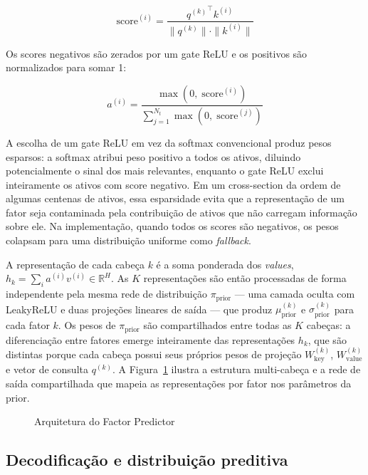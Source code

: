 \begin{equation}
    \text{score}^{(i)} = \frac{{q^{(k)}}^\top k^{(i)}}{\|q^{(k)}\| \cdot \|k^{(i)}\|}
    \label{eq:pred-score}
\end{equation}

Os scores negativos são zerados por um gate ReLU e os positivos são normalizados para
somar 1:

\begin{equation}
    a^{(i)} = \frac{\max\!\left(0,\; \text{score}^{(i)}\right)}{\sum_{j=1}^{N_t}
    \max\!\left(0,\; \text{score}^{(j)}\right)}
    \label{eq:pred-attn}
\end{equation}

A escolha de um gate ReLU em vez da softmax convencional \parencite{vaswani2017}
produz pesos esparsos: a softmax atribui peso positivo a todos os ativos, diluindo
potencialmente o sinal dos mais relevantes, enquanto o gate ReLU exclui inteiramente
os ativos com score negativo. Em um cross-section da ordem de algumas centenas de
ativos, essa esparsidade evita que a representação de um fator seja contaminada pela
contribuição de ativos que não carregam informação sobre ele. Na implementação, quando
todos os scores são negativos, os pesos colapsam para uma distribuição uniforme como
\textit{fallback}.

A representação de cada cabeça $k$ é a soma ponderada dos \textit{values}, $h_k =
\sum_i a^{(i)} v^{(i)} \in \mathbb{R}^H$. As $K$ representações são então processadas
de forma independente pela mesma rede de distribuição $\pi_{\text{prior}}$ --- uma
camada oculta com LeakyReLU e duas projeções lineares de saída --- que produz
$\mu_{\text{prior}}^{(k)}$ e $\sigma_{\text{prior}}^{(k)}$ para cada fator $k$. Os
pesos de $\pi_{\text{prior}}$ são compartilhados entre todas as $K$ cabeças: a
diferenciação entre fatores emerge inteiramente das representações $h_k$, que são
distintas porque cada cabeça possui seus próprios pesos de projeção $W_{\text{key}}^{(k)}$,
$W_{\text{value}}^{(k)}$ e vetor de consulta $q^{(k)}$. A Figura~\ref{fig:preditor}
ilustra a estrutura multi-cabeça e a rede de saída compartilhada que mapeia as
representações por fator nos parâmetros da prior.

\begin{figure}[ht]
    \centering
    
    \caption{Arquitetura do Factor Predictor}
    \label{fig:preditor}
\end{figure}


\subsection{Decodificação e distribuição preditiva}
\label{subsec:factor-decoder}

